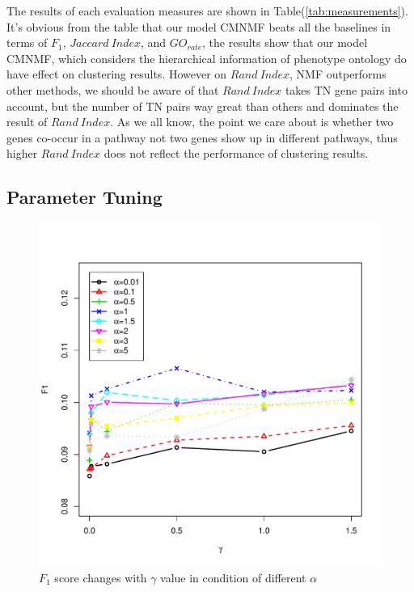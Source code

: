 \documentclass{bmcart}
\begin{document}
The results of each evaluation measures are shown in Table(\ref{tab:measurements}).
It's obvious from the table that our model CMNMF beats all the baselines in terms of $F_1$, $Jaccard\ Index$, and $GO_{rate}$, the results show that our model CMNMF, which considers the hierarchical information of phenotype ontology do have effect on clustering results. However on $Rand\ Index$, NMF outperforms other methods, we should be aware of that $Rand\ Index$ takes TN gene pairs into account, but the number of TN pairs way great than others and dominates the result of $Rand\ Index$. As we all know, the point we care about is whether two genes co-occur in a pathway not two genes show up in different pathways, thus higher $Rand\ Index$ does not reflect the performance of clustering results.

\subsection*{\textbf{Parameter Tuning}}
\begin{figure}[!h]
  \begin{minipage}[t]{0.7\linewidth}
    \includegraphics[width=\linewidth,origin = l]{DrawPictures/alpha-gamma.pdf}
  \end{minipage}
  \caption{$F_1$ score changes with $\gamma$ value in condition of different $\alpha$}
  \label{fig:alpha_gamma}
\end{figure}
\end{document}
